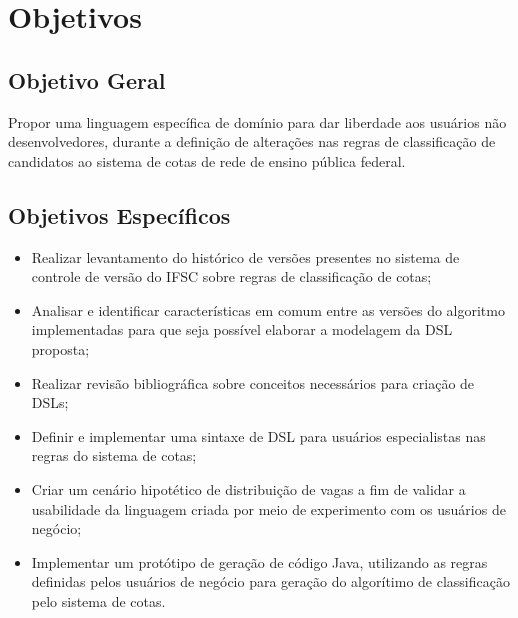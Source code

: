 \section{Objetivos}
\label{objetivos}

\subsection{Objetivo Geral}
\label{objetivogeral}

Propor uma linguagem específica de domínio para dar liberdade aos usuários não desenvolvedores, durante a definição de alterações nas regras de classificação de candidatos ao sistema de cotas de rede de ensino pública federal.

\subsection{Objetivos Específicos}
\label{objetivosespecificos}

\begin{itemize}
    \item Realizar levantamento do histórico de versões presentes no sistema de controle de versão do \gls{IFSC} sobre regras de classificação de cotas;
    \item Analisar e identificar características em comum entre as versões do algoritmo implementadas para que seja possível elaborar a modelagem da \gls{DSL} proposta;
    \item Realizar revisão bibliográfica sobre conceitos necessários para criação de \gls{DSL}s;
    \item Definir e implementar uma sintaxe de \gls{DSL} para usuários especialistas nas regras do sistema de cotas;
    \item Criar um cenário hipotético de distribuição de vagas a fim de validar a usabilidade da linguagem criada por meio de experimento com os usuários de negócio;
    \item Implementar um protótipo de geração de código Java, utilizando as regras definidas pelos usuários de negócio para geração do algorítimo de classificação pelo sistema de cotas.
\end{itemize}{}
